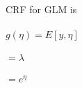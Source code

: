 \newcommand\tab[1][1cm]{\hspace*{#1}}
\begin{answer}
\\ \\ \\ \\
CRF for GLM is \\ \\
\tab[3cm] $g(\eta) = E[y, \eta]$ \\ \\
\tab[4.5cm]$=\lambda$ \\ \\
\tab[4.5cm]$=e^\eta$ \\ \\
\end{answer}
